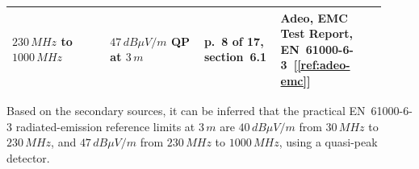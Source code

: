 \begin{table}[H]
\begin{tabular}{@{}p{0.25\linewidth}p{0.24\linewidth}p{0.16\linewidth}p{0.27\linewidth}@{}}
{\raggedright \(230\,MHz\) to \(1000\,MHz\)\par} &
{\raggedright \(47\,dB\mu V/m\) QP at \(3\,m\)\par} &
{\raggedright p.~8 of 17, section~6.1\par} &
{\raggedright Adeo, EMC Test Report, EN~61000-6-3~[\ref{ref:adeo-emc}]\par} \\

\hline
\end{tabular}
\end{table}

Based on the secondary sources, it can be inferred that the practical
EN~61000-6-3 radiated-emission reference limits at \(3\,m\) are
\(40\,dB\mu V/m\) from \(30\,MHz\) to \(230\,MHz\), and
\(47\,dB\mu V/m\) from \(230\,MHz\) to \(1000\,MHz\), using a quasi-peak
detector.



